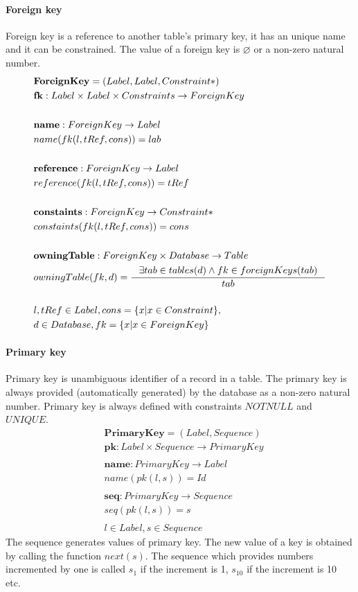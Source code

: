 \documentclass[11pt]{article}
\begin{document}
\paragraph{Foreign key} Foreign key is a reference to another table's primary key, it has an unique name and it can be constrained. The value of a foreign key is $\varnothing$ or a non-zero natural number.
\begin{align*}
&	\mathbf{ForeignKey} = (Label, Label, Constraint*) \\ 
&	\mathbf{fk} : Label \times Label \times Constraints \rightarrow ForeignKey \\ \\
&	\mathbf{name} : ForeignKey \rightarrow Label \\
&	name(fk(l, tRef, cons)) = lab  \\ \\
&	\mathbf{reference} : ForeignKey \rightarrow Label  \\
&	reference(fk(l, tRef, cons)) = tRef  \\ \\
&	\mathbf{constaints} : ForeignKey \rightarrow Constraint*  \\
&	constaints(fk(l, tRef, cons)) = cons  \\ \\
&	\mathbf{owningTable} : ForeignKey \times Database \rightarrow Table  \\
&	owningTable(fk, d) = \inference{\exists tab \in tables(d) \wedge fk \in foreignKeys(tab)}{tab}\\\\
&	l, tRef \in Label, cons  = \{ x | x \in Constraint\}, \\ 
& d \in Database, fk = \{ x | x \in ForeignKey\}
\end{align*}


\paragraph{Primary key} Primary key is unambiguous identifier of a record in a table. The primary key is always provided (automatically generated) by the database as a non-zero natural number. Primary key is always defined with constraints $NOTNULL$ and $UNIQUE$. 
\begin{align*}
&	\mathbf{PrimaryKey} =  ( Label, Sequence ) 	\\
&	\mathbf{pk} : Label \times Sequence \rightarrow PrimaryKey \\\\
&	\mathbf{name} : PrimaryKey \rightarrow Label \\
&	name(pk(l, s)) = Id \\\\
&	\mathbf{seq} : PrimaryKey \rightarrow Sequence \\
&   seq(pk(l,s)) = s \\\\
& l \in Label, s \in Sequence
\end{align*}
The sequence generates values of primary key. The new value of a key is obtained by calling the function $next(s)$. The sequence which provides numbers incremented by one is called $s_1$ if the increment is 1, $s_{10}$ if the increment is 10 etc.
\end{document}
